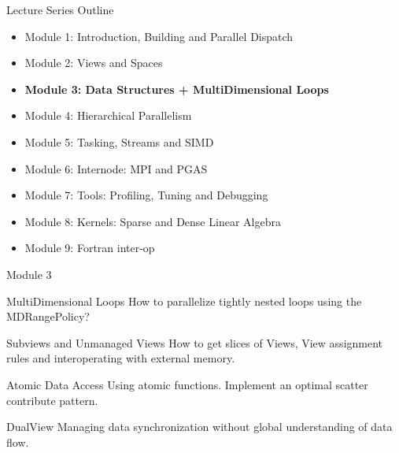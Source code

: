 \begin{frame}{Lecture Series Outline}

\begin{itemize}
        \item Module 1: Introduction, Building and Parallel Dispatch
        \item Module 2: Views and Spaces
	\item \textbf{Module 3: Data Structures + MultiDimensional Loops}
        \item Module 4: Hierarchical Parallelism
        \item Module 5: Tasking, Streams and SIMD
        \item Module 6: Internode: MPI and PGAS
        \item Module 7: Tools: Profiling, Tuning and Debugging
        \item Module 8: Kernels: Sparse and Dense Linear Algebra
        \item Module 9: Fortran inter-op
\end{itemize}
\end{frame}

\begin{frame}{Module 3}
  \begin{block}{MultiDimensional Loops}
    How to parallelize tightly nested loops using the MDRangePolicy?
  \end{block}

  \begin{block}{Subviews and Unmanaged Views}
    How to get slices of Views, View assignment rules and interoperating with external memory.
  \end{block}

  \begin{block}{Atomic Data Access}
    Using atomic functions. Implement an optimal scatter contribute pattern.
  \end{block}

  \begin{block}{DualView}
    Managing data synchronization without global understanding of data flow.
  \end{block}
\end{frame}








